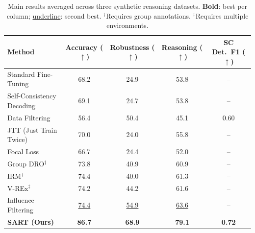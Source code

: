 \begin{table}[t]
\centering
\caption{Main results averaged across three synthetic reasoning datasets. \textbf{Bold}: best per column; \underline{underline}: second best. $^\dagger$Requires group annotations. $^\ddagger$Requires multiple environments.}
\label{tab:main_results}
\small
\begin{tabular}{lcccc}
\toprule
\textbf{Method} & \textbf{Accuracy} ($\uparrow$) & \textbf{Robustness} ($\uparrow$) & \textbf{Reasoning} ($\uparrow$) & \textbf{SC Det.\ F1} ($\uparrow$) \\
\midrule
Standard Fine-Tuning        & 68.2 & 24.9  & 53.8 & -- \\
Self-Consistency Decoding   & 69.1 & 24.7  & 53.8 & -- \\
Data Filtering              & 56.4 & 50.4  & 45.1 & 0.60 \\
JTT (Just Train Twice)      & 70.0 & 24.0  & 55.8 & -- \\
Focal Loss                  & 66.7 & 24.4  & 52.0 & -- \\
Group DRO$^\dagger$         & 73.8 & 40.9  & 60.9 & -- \\
IRM$^\ddagger$              & 74.4 & 40.0  & 61.3 & -- \\
V-REx$^\ddagger$            & 74.2 & 44.2  & 61.6 & -- \\
Influence Filtering         & \underline{74.4} & \underline{54.9}  & \underline{63.6} & -- \\
\midrule
\textbf{SART (Ours)}        & \textbf{86.7} & \textbf{68.9}  & \textbf{79.1} & \textbf{0.72} \\
\bottomrule
\end{tabular}
\end{table}

